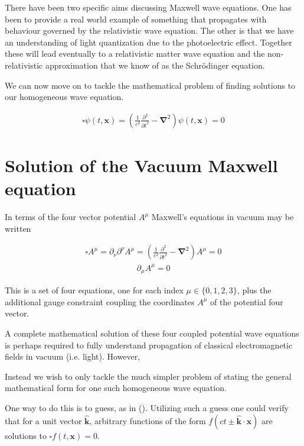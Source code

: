 \documentclass[]{eliblog}
\newcommand{\Bk}[0]{\mathbf{k}}
\newcommand{\Bx}[0]{\mathbf{x}}
\newcommand{\spacegrad}[0]{\boldsymbol{\nabla}}
\newcommand{\delambertian}[0]{\square}
\newcommand{\kcap}[0]{\hat{\Bk}}
\begin{document}
There have been two specific aims discussing Maxwell wave equations.
One has been to provide a real world example of something that propagates with behaviour
governed by the relativistic wave equation.  The other is that we have an understanding 
of light quantization due to the photoelectric effect.  Together these 
will lead eventually to a relativistic matter wave equation and
the non-relativistic approximation that we know of as the 
Schr\"{o}dinger equation.

We can now move on to tackle the mathematical problem of finding solutions to our 
homogeneous wave equation.

\begin{align}
\delambertian \psi(t,\Bx) = \left( \frac{1}{c^2}\frac{\partial^2}{{\partial t}^2} - \spacegrad^2 \right) \psi(t,\Bx) = 0
\end{align}

\section{Solution of the Vacuum Maxwell equation}

In terms of the four vector potential $A^\mu$
Maxwell's equations in vacuum may be written 

\begin{align}\label{eqn:waveMax}
\delambertian A^\mu = \partial_\nu \partial^\nu A^\mu = \left( \frac{1}{c^2}\frac{\partial^2}{{\partial t}^2} - \spacegrad^2 \right) A^\mu = 0
\end{align}
\begin{align}
\partial_\mu A^\mu = 0
\end{align}

This is a set of four equations, one for each index $\mu \in \{0,1,2,3\}$, plus
the additional gauge constraint coupling the coordinates $A^\mu$ of the
potential four vector.

A complete mathematical solution of these four coupled potential 
wave equations is perhaps required to fully understand propagation of
classical electromagnetic fields in vacuum (i.e. light).  However, 

Instead we wish to only tackle the much simpler problem of stating the general mathematical form for one such homogeneous
wave equation.

One way to do this is to guess, as in (\cite{french1971vaw}).   
Utilizing such a guess one could verify that for a unit vector $\kcap$, arbitrary
functions of the form $f(ct \pm \kcap \cdot \Bx)$ are solutions to $\delambertian f(t,\Bx) = 0$.
\end{document}
